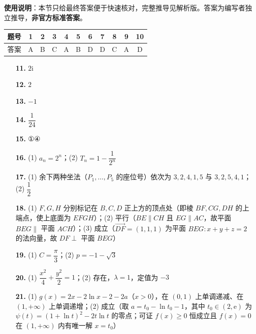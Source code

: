 
\begin{gknotice}
\textbf{使用说明}：本节只给最终答案便于快速核对，完整推导见解析版。答案为编写者独立推导，\textbf{非官方标准答案}。
\end{gknotice}

\begin{center}\begin{tabular}{ccccccccccc}
\toprule
题号 & 1 & 2 & 3 & 4 & 5 & 6 & 7 & 8 & 9 & 10 \\
\midrule
答案 & A & B & C & A & B & D & D & C & A & D \\
\bottomrule
\end{tabular}\end{center}

\begin{itemize}[leftmargin=2.6em]
  \item[\textbf{11.}] \(2\mathrm{i}\)
  \item[\textbf{12.}] \(2\)
  \item[\textbf{13.}] \(-1\)
  \item[\textbf{14.}] \(\dfrac{1}{24}\)
  \item[\textbf{15.}] ①④
\end{itemize}

\begin{itemize}[leftmargin=2.6em]
  \item[\textbf{16.}] (1) \(a_n=2^n\)；(2) \(T_n=1-\dfrac{1}{2^n}\)
  \item[\textbf{17.}] (1) 余下两种坐法（\(P_1,\dots,P_5\) 的座位号）依次为 \(3,2,4,1,5\) 与 \(3,2,5,4,1\)；(2) \(\dfrac{1}{2}\)
  \item[\textbf{18.}] (1) \(F,G,H\) 分别标记在 \(B,C,D\) 正上方的顶点处（即棱 \(BF,CG,DH\) 的上端点，使上底面为 \(EFGH\)）；(2) 平行（\(BE\parallel CH\) 且 \(EG\parallel AC\)，故平面 \(BEG\parallel\) 平面 \(ACH\)）；(3) 成立（\(\overrightarrow{DF}=(1,1,1)\) 为平面 \(BEG:x+y+z=2\) 的法向量，故 \(DF\perp\) 平面 \(BEG\)）
  \item[\textbf{19.}] (1) \(C=\dfrac{\pi}{3}\)；(2) \(p=-1-\sqrt{3}\)
  \item[\textbf{20.}] (1) \(\dfrac{x^2}{4}+\dfrac{y^2}{2}=1\)；(2) 存在，\(\lambda=1\)，定值为 \(-3\)
  \item[\textbf{21.}] (1) \(g(x)=2x-2\ln x-2-2a\)（\(x>0\)），在 \((0,1)\) 上单调递减、在 \((1,+\infty)\) 上单调递增；(2) 成立（取 \(a=t_0-\ln t_0-1\)，其中 \(t_0\in(2,\mathrm{e})\) 为 \(\psi(t)=(1+\ln t)^2-2t\ln t\) 的零点；可证 \(f(x)\geqslant 0\) 恒成立且 \(f(x)=0\) 在 \((1,+\infty)\) 内有唯一解 \(x=t_0\)）
\end{itemize}
